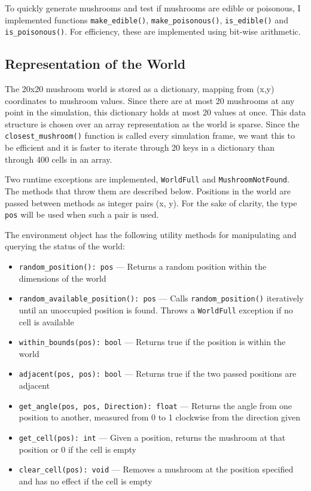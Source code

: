 \documentclass[12pt,a4paper,twoside,openright]{report}
\begin{document}
To quickly generate mushrooms and test if mushrooms are edible or poisonous, I implemented functions \texttt{make\_edible()}, \texttt{make\_poisonous()}, \texttt{is\_edible()} and \texttt{is\_poisonous()}. For efficiency, these are implemented using bit-wise arithmetic.

\subsection{Representation of the World}

The 20x20 mushroom world is stored as a dictionary, mapping from (x,y) coordinates to mushroom values. Since there are at most 20 mushrooms at any point in the simulation, this dictionary holds at most 20 values at once. This data structure is chosen over an array representation as the world is sparse. Since the \texttt{closest\_mushroom()} function is called every simulation frame, we want this to be efficient and it is faster to iterate through 20 keys in a dictionary than through 400 cells in an array. 

Two runtime exceptions are implemented, \texttt{WorldFull} and \texttt{MushroomNotFound}. The methods that throw them are described below. Positions in the world are passed between methods as integer pairs (x, y). For the sake of clarity, the type \texttt{pos} will be used when such a pair is used.

The environment object has the following utility methods for manipulating and querying the status of the world:

\begin{itemize}
	\item \texttt{random\_position(): pos} --- Returns a random position within the dimensions of the world
	\item \texttt{random\_available\_position(): pos} --- Calls \texttt{random\_position()} iteratively until an unoccupied position is found. Throws a \texttt{WorldFull} exception if no cell is available
	\item \texttt{within\_bounds(pos): bool} --- Returns true if the position is within the world
	\item \texttt{adjacent(pos, pos): bool} --- Returns true if the two passed positions are adjacent
	\item \texttt{get\_angle(pos, pos, Direction): float} --- Returns the angle from one position to another, measured from 0 to 1 clockwise from the direction given
	\item \texttt{get\_cell(pos): int} --- Given a position, returns the mushroom at that position or 0 if the cell is empty
	\item \texttt{clear\_cell(pos): void} --- Removes a mushroom at the position specified and has no effect if the cell is empty
\end{itemize}
\end{document}
